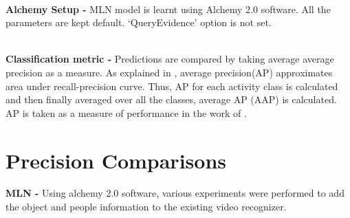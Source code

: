 ~ \\
{\bf Alchemy Setup - } MLN model is learnt using Alchemy 2.0 \cite{alchemy2.0} software.
All the parameters are kept default. `QueryEvidence' option is not set.

~\\
{\bf Classification metric - } Predictions are compared by taking  average average precision as a measure.
As explained in \cite{actionsInContext}, average precision(AP) approximates area under recall-precision curve.
Thus, AP for each activity class is calculated and then finally averaged over all the classes, average AP (AAP) is calculated.
AP is taken as a measure of performance in the work of \cite{actionsInContext}.

\section{Precision Comparisons}
{\bf MLN - } Using alchemy 2.0 \cite{alchemy2.0} software, various experiments were performed 
to add the object and people information to the existing video recognizer. 

